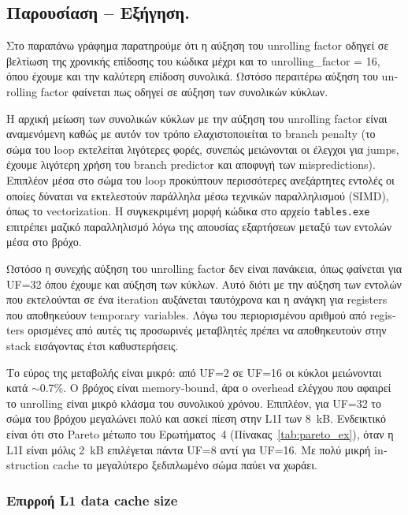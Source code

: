 \documentclass[11pt,a4paper]{article}
\newcommand{\code}[1]{\texttt{#1}}
\newcommand{\en}[1]{\foreignlanguage{english}{#1}}
\begin{document}
\subsection*{Παρουσίαση -- Εξήγηση.}
Στο παραπάνω γράφημα παρατηρούμε ότι η αύξηση του \en{unrolling factor} οδηγεί σε βελτίωση της χρονικής
επίδοσης του κώδικα μέχρι και το \en{unrolling\_factor} = 16, όπου έχουμε και την καλύτερη επίδοση
συνολικά. Ωστόσο περαιτέρω αύξηση του \en{unrolling factor} φαίνεται πως οδηγεί σε αύξηση των συνολικών
κύκλων.

Η αρχική μείωση των συνολικών κύκλων με την αύξηση του \en{unrolling factor} είναι αναμενόμενη καθώς με
αυτόν τον τρόπο ελαχιστοποιείται το \en{branch penalty} (το σώμα του \en{loop} εκτελείται λιγότερες φορές,
συνεπώς μειώνονται οι έλεγχοι για \en{jumps}, έχουμε λιγότερη χρήση του \en{branch predictor} και
αποφυγή των \en{mispredictions}). Επιπλέον μέσα στο σώμα του \en{loop} προκύπτουν περισσότερες ανεξάρτητες
εντολές οι οποίες δύναται να εκτελεστούν παράλληλα μέσω τεχνικών παραλληλισμού (SIMD), όπως το
\en{vectorization}. Η συγκεκριμένη μορφή κώδικα στο αρχείο \code{tables.exe} επιτρέπει μαζικό
παραλληλισμό λόγω της απουσίας εξαρτήσεων μεταξύ των εντολών μέσα στο βρόχο.

Ωστόσο η συνεχής αύξηση του \en{unrolling factor} δεν είναι πανάκεια, όπως φαίνεται για UF=32 όπου έχουμε
και αύξηση των κύκλων. Αυτό διότι με την αύξηση των εντολών που εκτελούνται σε ένα \en{iteration}
αυξάνεται ταυτόχρονα και η ανάγκη για \en{registers} που αποθηκεύουν \en{temporary variables}. Λόγω του
περιορισμένου αριθμού από \en{registers} ορισμένες από αυτές τις προσωρινές μεταβλητές πρέπει να
αποθηκευτούν στην \en{stack} εισάγοντας έτσι καθυστερήσεις.

\begin{insight}
Το εύρος της μεταβολής είναι μικρό: από UF=2 σε UF=16 οι κύκλοι μειώνονται κατά $\sim$0.7\%. Ο βρόχος
είναι \en{memory-bound}, άρα ο \en{overhead} ελέγχου που αφαιρεί το \en{unrolling} είναι μικρό
κλάσμα του συνολικού χρόνου. Επιπλέον, για UF=32 το σώμα του βρόχου μεγαλώνει πολύ και ασκεί
πίεση στην L1I των \SI{8}{kB}. Ενδεικτικό είναι ότι στο Pareto μέτωπο του Ερωτήματος~4 (Πίνακας~\ref{tab:pareto_ex}), όταν η L1I
είναι μόλις \SI{2}{kB} επιλέγεται πάντα UF=8 αντί για UF=16. Με πολύ μικρή \en{instruction cache} το
μεγαλύτερο ξεδιπλωμένο σώμα παύει να χωράει.
\end{insight}

\subsubsection*{Επιρροή L1 \en{data cache size}}
\end{document}
